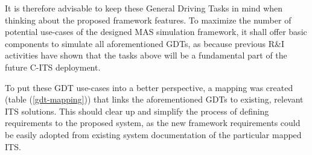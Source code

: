 \documentclass[main.tex]{subfiles}
\begin{document}
It is therefore advisable to keep these General Driving Tasks in mind when thinking about the proposed framework 
features. To maximize the number of potential use-cases of the designed MAS simulation framework, 
it shall offer basic components to simulate all aforementioned GDTs, as because previous R\&I
activities have shown that the tasks above will be a fundamental part of the future C-ITS deployment.

To put these GDT use-cases into a better perspective, a mapping was created (table
(\ref{gdt-mapping})) that links the aforementioned GDTs to existing, relevant ITS solutions.
This should clear up and simplify the process of defining requirements to the proposed system,
as the new framework requirements could be easily adopted from existing system documentation of
the particular mapped ITS.
\end{document}
